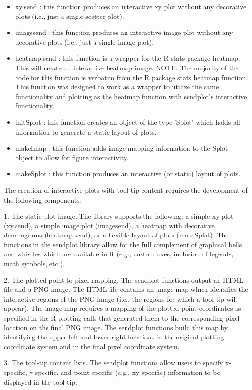 \documentclass[]{article}
\begin{document}
\begin{itemize}
\item xy.send : this function produces an interactive xy plot without any decorative plots (i.e., just a single scatter-plot).
\item imagesend :  this function produces an interactive image plot without any decorative plots (i.e., just a single image plot).
\item heatmap.send : this function is a wrapper for the R stats package heatmap. This will
create an interactive heatmap image. NOTE: The majority of the code for
this function is verbatim from the R package stats heatmap
function. This function was designed to work as a wrapper to utilize
the same functionality and plotting as the heatmap function with
sendplot's interactive functionality.
\item initSplot : this function creates an object of the type 'Splot' which holds all information to generate a static layout of plots. 
\item makeImap : this function adds image mapping information to the Splot object to allow for figure interactivity.  
\item makeSplot : this function produces an interactive (or static) layout of plots. 
\end{itemize}


\indent The creation of interactive plots with tool-tip content requires the development of the following components:
\begin{description}
\item 1. The static plot image. The library supports the following: a simple xy-plot (xy.send), a simple image plot (imagesend), a heatmap with decorative dendrograms (heatmap.send), or a flexible layout of plots (makeSplot). The functions in the sendplot library allow for the full complement of graphical bells and whistles which are available in R (e.g., custom axes, inclusion of legends, math symbols, etc.). 
\item 2. The plotted point to pixel mapping. The sendplot functions output an HTML file and a PNG image. The HTML file contains an image map which identifies the interactive regions of the PNG image (i.e., the regions for which a tool-tip will appear). The image map requires a mapping of the plotted point coordinates as specified in the R plotting calls that generated them to the corresponding pixel location on the final PNG image. The sendplot functions build this map by identifying the upper-left and lower-right locations in the original plotting coordinate system and in the final pixel coordinate system. 
\item 3. The tool-tip content lists. The sendplot functions allow users to specify  x-specific, y-specific, and point specific (e.g., xy-specific) information to be displayed in the tool-tip. 
\end{description}
\end{document}
